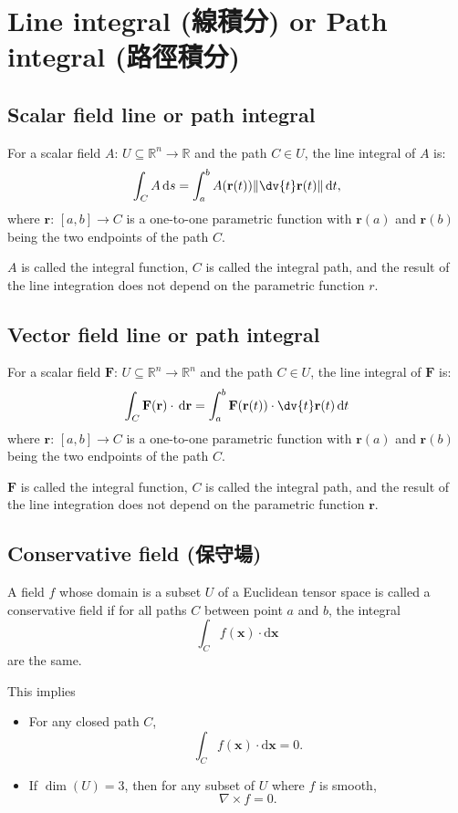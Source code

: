 \documentclass[a4paper,12pt]{report}
\begin{document}
\section{Line integral (線積分) or Path integral (路徑積分)}
\subsection{Scalar field line or path integral}
For a scalar field $A : \,U\subseteq \mathbb {R} ^{n}\to \mathbb {R}$ and the path $C \in U$, the line integral of $A$ is: 
\[\int _{C}A\,\mathrm {d} s=\int _{a}^{b}A(\mathbf{r}(t))\|\dv{t}\mathbf {r} (t)\|\,\mathrm {d} t,\]
where $\mathbf{r}:\, [a, b] \to C$ is a one-to-one parametric function with $\mathbf{r}(a)$ and $\mathbf{r}(b)$ being the two endpoints of the path $C$. 

$A$ is called the integral function, $C$ is called the integral path, and the result of the line integration does not depend on the parametric function $r$.
\subsection{Vector field line or path integral}
For a scalar field $\mathbf{F}: \,U\subseteq \mathbb {R} ^{n}\to \mathbb {R}^n$ and the path $C \in U$, the line integral of $\mathbf{F}$ is: 
\[\int _{C}\mathbf {F} (\mathbf {r} )\cdot \,\mathrm {d} \mathbf{r}=\int _{a}^{b}\mathbf {F} (\mathbf {r} (t))\cdot \dv{t}\mathbf {r} (t)\,\mathrm {d} t\]
where $\mathbf{r}:\, [a, b] \to C$ is a one-to-one parametric function with $\mathbf{r}(a)$ and $\mathbf{r}(b)$ being the two endpoints of the path $C$. 

$\mathbf{F}$ is called the integral function, $C$ is called the integral path, and the result of the line integration does not depend on the parametric function $\mathbf{r}$.
\subsection{Conservative field (保守場)}
A field $f$ whose domain is a subset $U$ of a Euclidean tensor space is called a conservative field if for all paths $C$ between point $a$ and $b$, the integral 
\[\int_Cf(\mathbf{x})\cdot\mathrm{d}\mathbf{x}\]
are the same.

This implies 
\begin{itemize}
\item For any closed path $C$, 
\[\int_Cf(\mathbf{x})\cdot\mathrm{d}\mathbf{x}=0.\]
\item If $\operatorname{dim}(U)=3$, then for any subset of $U$ where $f$ is smooth,
\[\nabla\times f=0.\]
\end{itemize}
\end{document}
